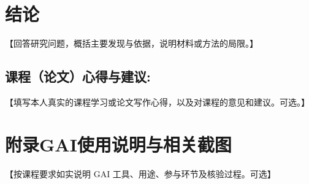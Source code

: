 \documentclass{milpaper}
\begin{document}
\section{结论}
【回答研究问题，概括主要发现与依据，说明材料或方法的局限。】

\printbibliography

\subsection*{课程（论文）心得与建议:}
【填写本人真实的课程学习或论文写作心得，以及对课程的意见和建议。可选。】

\section*{附录\quad GAI使用说明与相关截图}
【按课程要求如实说明 GAI 工具、用途、参与环节及核验过程。可选】

\begin{center}
\end{center}
\end{document}
